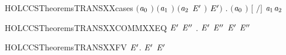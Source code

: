 \begin{SaveVerbatim}{HOLCCSTheoremsTRANSXXcases}
        \ensuremath{(}\ensuremath{\HOLBoundVar{a}\sb{\mathrm{0}}} \HOLSymConst{\ensuremath{=}}   \ensuremath{)} \HOLSymConst{\HOLTokenConj{}} \ensuremath{(}\ensuremath{\HOLBoundVar{a}\sb{\mathrm{1}}} \HOLSymConst{\ensuremath{=}}   \ensuremath{)} \HOLSymConst{\HOLTokenConj{}}
        \ensuremath{(}\ensuremath{\HOLBoundVar{a}\sb{\mathrm{2}}} \HOLSymConst{\ensuremath{=}}  \ensuremath{\HOLBoundVar{E}\sp{\prime{}}} \ensuremath{)} \HOLSymConst{\HOLTokenConj{}}  \HOLTokenTransBegin{}\HOLTokenTransEnd \ensuremath{\HOLBoundVar{E}\sp{\prime{}}}\ensuremath{)} \HOLSymConst{\HOLTokenDisj{}}
     \HOLSymConst{\HOLTokenExists{}} . \ensuremath{(}\ensuremath{\HOLBoundVar{a}\sb{\mathrm{0}}} \HOLSymConst{\ensuremath{=}}   \ensuremath{)} \HOLSymConst{\HOLTokenConj{}} \ensuremath{[}  \ensuremath{/}\ensuremath{]}  \HOLTokenTransBegin\ensuremath{\HOLBoundVar{a}\sb{\mathrm{1}}}\HOLTokenTransEnd \ensuremath{\HOLBoundVar{a}\sb{\mathrm{2}}}
\end{SaveVerbatim}
\newcommand{\HOLCCSTheoremsTRANSXXcases}{\UseVerbatim{HOLCCSTheoremsTRANSXXcases}}
\begin{SaveVerbatim}{HOLCCSTheoremsTRANSXXCOMMXXEQ}
\HOLTokenTurnstile{} \HOLSymConst{\HOLTokenForall{}} \ensuremath{\HOLBoundVar{E}\sp{\prime{}}} \ensuremath{\HOLBoundVar{E}\sp{\prime{}\prime{}}} .  \HOLSymConst{\ensuremath{+}} \ensuremath{\HOLBoundVar{E}\sp{\prime{}}} \HOLTokenTransBegin{}\HOLTokenTransEnd \ensuremath{\HOLBoundVar{E}\sp{\prime{}\prime{}}} \HOLSymConst{\HOLTokenEquiv{}} \ensuremath{\HOLBoundVar{E}\sp{\prime{}}} \HOLSymConst{\ensuremath{+}}  \HOLTokenTransBegin{}\HOLTokenTransEnd \ensuremath{\HOLBoundVar{E}\sp{\prime{}\prime{}}}
\end{SaveVerbatim}
\newcommand{\HOLCCSTheoremsTRANSXXCOMMXXEQ}{\UseVerbatim{HOLCCSTheoremsTRANSXXCOMMXXEQ}}
\begin{SaveVerbatim}{HOLCCSTheoremsTRANSXXFV}
\HOLTokenTurnstile{} \HOLSymConst{\HOLTokenForall{}}  \ensuremath{\HOLBoundVar{E}\sp{\prime{}}}.  \HOLTokenTransBegin{}\HOLTokenTransEnd \ensuremath{\HOLBoundVar{E}\sp{\prime{}}} \HOLSymConst{\HOLTokenImp{}}  \ensuremath{\HOLBoundVar{E}\sp{\prime{}}} \HOLConst{\HOLTokenSubset{}}  
\end{SaveVerbatim}
